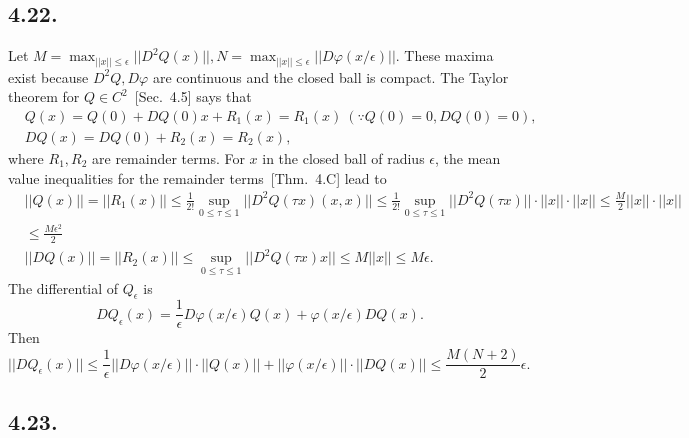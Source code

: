 \documentclass[a4paper,11pt,fleqn]{article}
\begin{document}
\subsection{4.22.}
 Let $M=\max_{||x||\le \epsilon}{||D^2Q(x)||}, N = \max_{||x||\le \epsilon}{||D\varphi(x/\epsilon)||}$. These maxima exist because $D^2Q, D\varphi$ are continuous and the closed ball is compact. The Taylor theorem for $Q\in C^2$~[Sec.~4.5]\cite{zeidler2012applied} says that
\begin{align}
    &Q(x) = Q(0) + DQ(0)x + R_1(x) = R_1(x) \ (\because Q(0)=0, DQ(0)=0), \\
    &DQ(x) = DQ(0) + R_2(x) = R_2(x),
\end{align}
where $R_1, R_2$ are remainder terms. For $x$ in the closed ball of radius $\epsilon$, the mean value inequalities for the remainder terms~[Thm.~4.C]\cite{zeidler2012applied} lead to 
\begin{align}
    &||Q(x)|| = ||R_1(x)|| \le \frac{1}{2!}\sup_{0\le\tau\le 1}{||D^2Q(\tau x)(x,x)||}\le \frac{1}{2!}\sup_{0\le\tau\le 1}{||D^2Q(\tau x)}|| \cdot ||x|| \cdot ||x|| \le \frac{M}{2}||x|| \cdot ||x|| \nonumber \\
    & \le \frac{M\epsilon^2}{2} \\
    &||DQ(x)|| = ||R_2(x)|| \le \sup_{0\le\tau\le 1}{||D^2Q(\tau x)x||} \le M ||x|| \le M\epsilon.
\end{align}
The differential of $Q_\epsilon$ is 
\begin{equation}
    DQ_\epsilon(x) = \frac{1}{\epsilon}D\varphi(x/\epsilon)Q(x) + \varphi(x/\epsilon)DQ(x).
\end{equation}
Then 
\begin{equation}
    ||DQ_\epsilon(x)|| \le \frac{1}{\epsilon} || D\varphi(x/\epsilon) ||\cdot ||Q(x)|| + ||\varphi(x/\epsilon)||\cdot ||DQ(x)||
    \le \frac{M(N+2)}{2}\epsilon.
\end{equation}
\hruleskip

\subsection{4.23.}

\end{document}
